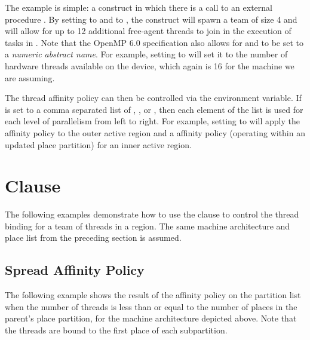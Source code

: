 \clearpage


The example is simple: a  construct in which there is a call to
an external procedure . By setting  to 
and  to , the construct will spawn a team of size 4
and will allow for up to 12 additional free-agent threads to join in the execution
of tasks in . Note that the OpenMP 6.0 specification also allows for
 and  to be set to a
\emph{numeric abstract name}. For example, setting  to
 will set it to the number of hardware threads available on
the device, which again is 16 for the machine we are assuming.

The thread affinity policy can then be controlled via the 
environment variable. 
If  is set to
a comma separated list of , , or ,
then each element of the list is used for each level of parallelism from left
to right. For example, setting  to 
will apply the  affinity policy to the outer active
 region and a  affinity policy (operating within
an updated place partition) for an inner active  region.


\section{ Clause} \label{sec:affinity}
 

The following examples demonstrate how to use the  clause to
control the thread binding for a team of threads in a  region.
The same machine architecture and place list from the preceding section is
assumed.

\subsection{Spread Affinity Policy} \label{subsec:affinity_spread}
 


The following example shows the result of the  affinity policy on
the partition list when the number of threads is less than or equal to the
number of places in the parent's place partition, for the machine architecture
depicted above. Note that the threads are bound to the first place of each
subpartition.


